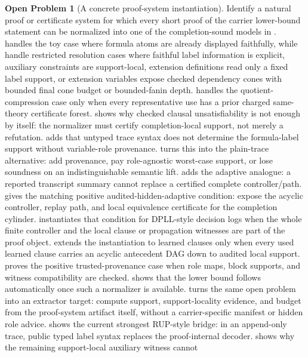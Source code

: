 \documentclass[11pt]{article}
\theoremstyle{definition}
\newtheorem{openproblem}[theorem]{Open Problem}
\begin{document}
\begin{openproblem}[A concrete proof-system instantiation]\label{op:proof-system}
Identify a natural proof or certificate system for which every short proof of the carrier lower-bound statement can be normalized into one of the completion-sound models in .   handles the toy case where formula atoms are already displayed faithfully, while  handle restricted resolution cases where faithful label information is explicit, auxiliary constraints are support-local, extension definitions read only a fixed label support, or extension variables expose checked dependency cones with bounded final cone budget or bounded-fanin depth.   handles the quotient-compression case only when every representative use has a prior charged same-theory certificate forest.   shows why checked clausal unsatisfiability is not enough by itself: the normalizer must certify completion-local support, not merely a refutation.   adds that untyped trace syntax does not determine the formula-label support without variable-role provenance.   turns this into the plain-trace alternative: add provenance, pay role-agnostic worst-case support, or lose soundness on an indistinguishable semantic lift.   adds the adaptive analogue: a reported transcript summary cannot replace a certified complete controller/path.   gives the matching positive audited-hidden-adaptive condition: expose the acyclic controller, replay path, and local equivalence certificate for the completion cylinder.   instantiates that condition for DPLL-style decision logs when the whole finite controller and the local clause or propagation witnesses are part of the proof object.   extends the instantiation to learned clauses only when every used learned clause carries an acyclic antecedent DAG down to audited local support.   proves the positive trusted-provenance case when role maps, block supports, and witness compatibility are checked.   shows that the lower bound follows automatically once such a normalizer is available.   turns the same open problem into an extractor target: compute support, support-locality evidence, and budget from the proof-system artifact itself, without a carrier-specific manifest or hidden role advice.   shows the current strongest RUP-style bridge: in an append-only trace, public typed label syntax replaces the proof-internal decoder.   shows why the remaining support-local auxiliary witness cannot 
\end{openproblem}
\end{document}

